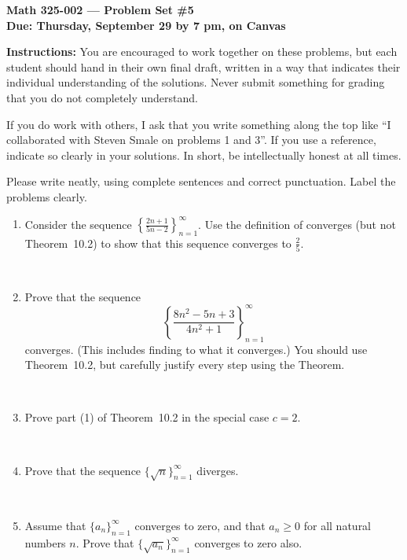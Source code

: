 \documentclass{amsart}
\def\R{\mathbb R}
\def\ds{\displaystyle}
\begin{document}
\begin{center}
{\large\bfseries
Math 325-002 --- Problem Set \#5 \\
Due: Thursday, September 29 by 7 pm, on Canvas}
\end{center}





{\bf Instructions:} You are encouraged to work together on these
problems, but each student should hand in their own final draft,
written in a way that indicates their individual understanding of
the solutions. Never submit something for grading
that you do not completely understand. 

If you do work with others, I ask that you write something along the
top like ``I collaborated with Steven Smale on problems 1 and 3''.
If you use a reference, indicate so clearly in your solutions. 
In short, be intellectually
honest at all times.

Please write neatly, using complete sentences and correct
punctuation. Label the problems clearly. 






\begin{enumerate}

\item Consider the sequence $\ds \left\{ \frac{2n+1}{5n-2} \right\}_{n=1}^\infty$.
Use the definition of converges (but not Theorem~10.2) to show that this sequence converges to $\ds \frac{2}{5}$.

\

\item Prove that the sequence \[ \left\{ \frac{ 8 n^2 - 5n +3} {4 n^2 + 1} \right\}_{n=1}^\infty\]
converges. (This includes finding to what it converges.) You should use Theorem~10.2, but carefully justify every step using the Theorem.

\


\item Prove part (1) of Theorem~10.2 in the special case $c=2$.
 
 \

\item Prove that the sequence $\{\sqrt{n}\}_{n=1}^\infty$ diverges.

\

\item Assume that $\{a_n\}_{n=1}^\infty$ converges to zero, and that $a_n\geq 0$ for all natural numbers $n$. Prove that $\{ \sqrt{a_n}\}_{n=1}^\infty$ converges to zero also.






\end{enumerate}
\end{document}
